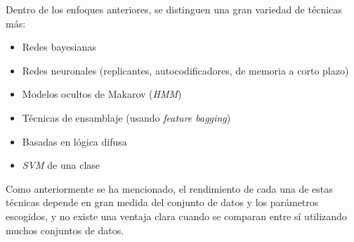 Dentro de los enfoques anteriores, se distinguen una gran variedad de técnicas más:
\begin{itemize}[noitemsep,topsep=0pt]
	\item Redes bayesianas
	\item Redes neuronales (replicantes, autocodificadores, de memoria a corto plazo)
	\item Modelos ocultos de Makarov (\textit{HMM})
	\item Técnicas de ensamblaje (usando \textit{feature bagging})
	\item Basadas en lógica difusa
	\item \textit{SVM} de una clase
\end{itemize}

Como anteriormente se ha mencionado, el rendimiento de cada una de estas técnicas depende
en gran medida del conjunto de datos y los parámetros escogidos, y no existe una ventaja
clara cuando se comparan entre sí utilizando muchos conjuntos de datos.~\cite{chandola2009anomaly}
